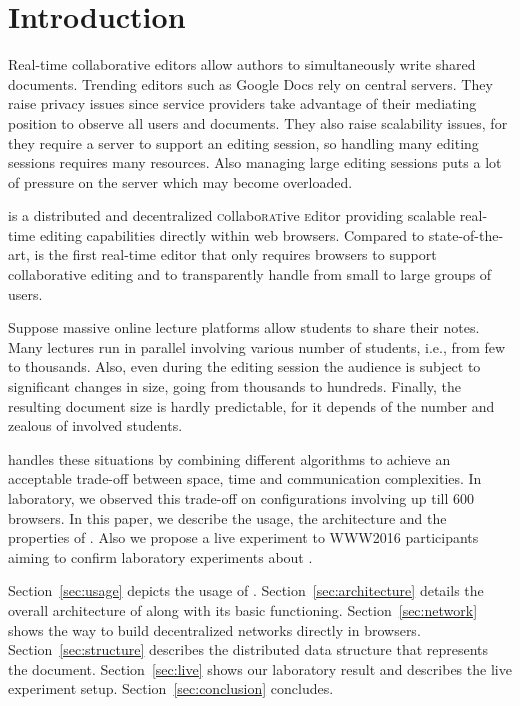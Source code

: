 
\section{Introduction}
\label{sec:introduction}

Real-time collaborative editors allow authors to simultaneously write shared
documents. Trending editors such as Google Docs rely on
central servers. They raise privacy issues since service providers take
advantage of their mediating position to observe all users and documents. They
also raise scalability issues, for they require a server to support an editing
session, so handling many editing sessions requires many resources. Also
managing large editing sessions puts a lot of pressure on the server which may
become overloaded.


\CRATE is a distributed and decentralized \textsc{c}ollabo\textsc{rat}ive
\textsc{e}ditor providing scalable real-time editing capabilities directly
within web browsers. Compared to state-of-the-art, \CRATE is the first real-time
editor that only requires browsers to support collaborative editing and to
transparently handle from small to large groups of users.

Suppose massive online lecture platforms allow students to share their
notes. Many lectures run in parallel involving various number of students, i.e.,
from few to thousands. Also, even during the editing session the audience is subject
to significant changes in size, going from thousands to hundreds. Finally, the
resulting document size is hardly predictable, for it depends of the number and
zealous of involved students.

\CRATE handles these situations by combining different algorithms to achieve an
acceptable trade-off between space, time and communication complexities. In
laboratory, we observed this trade-off on configurations involving up till 600
browsers. In this paper, we describe the usage, the architecture and the
properties of \CRATE. Also we propose a live experiment to WWW2016 participants
aiming to confirm laboratory experiments about \CRATE.

Section~\ref{sec:usage} depicts the usage of \CRATE.
Section~\ref{sec:architecture} details the overall architecture of \CRATE along
with its basic functioning. Section~\ref{sec:network} shows the way to build
decentralized networks directly in browsers.  Section~\ref{sec:structure}
describes the distributed data structure that represents the document.
Section~\ref{sec:live} shows our laboratory result and describes the live
experiment setup. Section~\ref{sec:conclusion} concludes.


